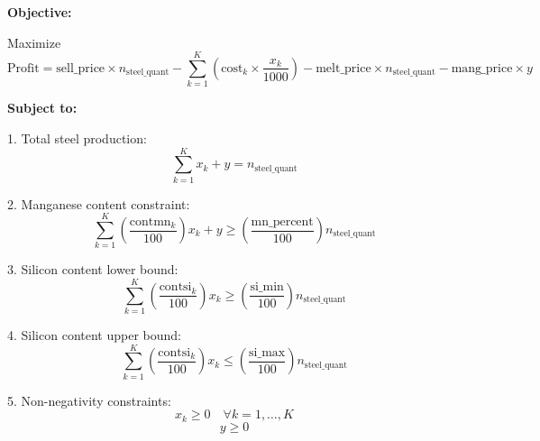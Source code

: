 \documentclass{article}
\begin{document}
\textbf{Objective:}

Maximize
\[
\text{Profit} = \text{sell\_price} \times n_{\text{steel\_quant}} - \sum_{k=1}^{K} \left(\text{cost}_k \times \frac{x_k}{1000}\right) - \text{melt\_price} \times n_{\text{steel\_quant}} - \text{mang\_price} \times y
\]

\textbf{Subject to:}

1. Total steel production:
   \[
   \sum_{k=1}^{K} x_k + y = n_{\text{steel\_quant}}
   \]

2. Manganese content constraint:
   \[
   \sum_{k=1}^{K} \left(\frac{\text{contmn}_k}{100}\right) x_k + y \geq \left(\frac{\text{mn\_percent}}{100}\right) n_{\text{steel\_quant}}
   \]

3. Silicon content lower bound:
   \[
   \sum_{k=1}^{K} \left(\frac{\text{contsi}_k}{100}\right) x_k \geq \left(\frac{\text{si\_min}}{100}\right) n_{\text{steel\_quant}}
   \]

4. Silicon content upper bound:
   \[
   \sum_{k=1}^{K} \left(\frac{\text{contsi}_k}{100}\right) x_k \leq \left(\frac{\text{si\_max}}{100}\right) n_{\text{steel\_quant}}
   \]

5. Non-negativity constraints:
   \[
   x_k \geq 0 \quad \forall k = 1, \ldots, K
   \]
   \[
   y \geq 0
   \]
\end{document}

